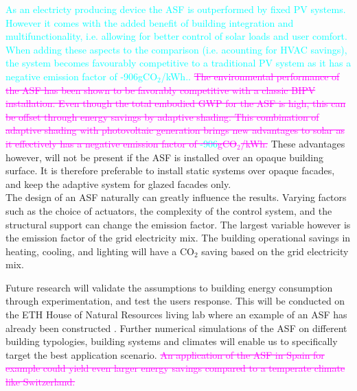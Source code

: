 

\textcolor{cyan}{As an electricty producing device the ASF is outperformed by fixed PV systems. However it comes with the added benefit of building integration and multifunctionality, i.e. allowing for better control of solar loads and user comfort. When adding these aspects to the comparison (i.e. acounting for HVAC savings), the system becomes favourably competitive to a traditional PV system as it has a negative emission factor of -906gCO${_2}$/kWh..} \textcolor{magenta}{\sout{The environmental performance of the ASF has been shown to be favorably competitive with a classic BIPV installation. Even though the total embodied GWP for the ASF is high, this can be offset through energy savings by adaptive shading. This combination of adaptive shading with photovoltaic generation brings new advantages to solar as it effectively has a negative emission factor of \textcolor{cyan}{-906}gCO${_2}$/kWh.}} These advantages however, will not be present if the ASF is installed over an opaque building surface. It is therefore preferable to install static systems over opaque facades, and keep the adaptive system for glazed facades only.\\

The design of an ASF naturally can greatly influence the results. Varying factors such as the choice of actuators, the complexity of the control system, and the structural support can change the emission factor. The largest variable however is the emission factor of the grid electricity mix. The building operational savings in heating, cooling, and lighting will have a CO${_2}$ saving based on the grid electricity mix. 

Future research will validate the assumptions to building energy consumption through experimentation, and test the users response. This will be conducted on the ETH House of Natural Resources living lab where an example of an ASF has already been constructed \cite{nagy2015frontiers}. Further numerical simulations of the ASF on different building typologies, building systems and climates will enable us to specifically target the best application scenario. \textcolor{magenta}{\sout{An application of the ASF in Spain for example could yield even larger energy savings compared to a temperate climate like Switzerland.}}\\

